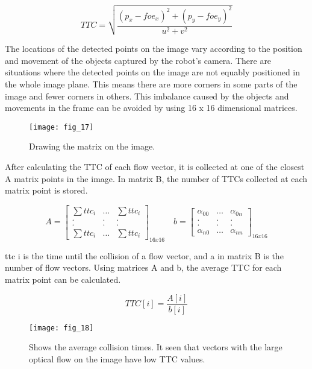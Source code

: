 \documentclass[twocolumn, switch]{article} %
\begin{document}
\begin{equation}
	TTC = \sqrt{\frac{(p_x-foe_x)^2+(p_y-foe_y)^2}{u^2+v^2}}
\end{equation}

The locations of the detected points on the image vary
according to the position and movement of the objects
captured by the robot's camera. There are situations where
the detected points on the image are not equably positioned
in the whole image plane. This means there are more corners
in some parts of the image and fewer corners in others. This
imbalance caused by the objects and movements in the frame
can be avoided by using 16 x 16 dimensional matrices.

\begin{figure}[h]
    \centering
    \texttt{[image: fig\_17]}
    \caption{Drawing the matrix on the image.}
    \label{fig:fig17}
\end{figure}

After calculating the TTC of each flow vector, it is collected
at one of the closest A matrix points in the image. In matrix
B, the number of TTCs collected at each matrix point is
stored.

\begin{equation}
	A=\begin{bmatrix}
		\sum ttc_i & \dots & \sum ttc_i\\
		.  & . & . \\
		.  & . & . \\
		\sum ttc_i & \dots & \sum ttc_i
	\end{bmatrix}_{16x16} \quad
	b=\begin{bmatrix}
		\alpha _{00} & \dots & \alpha _{0n}\\
		.  & . & . \\
		.  & . & . \\
		\alpha _{n0}  & \dots & \alpha _{nn} 
	\end{bmatrix}_{16x16}
\end{equation}

ttc i is the time until the collision of a flow vector, and a in
matrix B is the number of flow vectors. Using matrices A
and b, the average TTC for each matrix point can be
calculated.

\begin{equation}
	TTC[i] = \frac{A[i]}{b[i]}
\end{equation}

\begin{figure}[h]
    \centering
    \texttt{[image: fig\_18]}
    \caption{Shows the average collision times. It seen that
vectors with the large optical flow on the image have low
TTC values.}
    \label{fig:fig18}
\end{figure}
\end{document}
